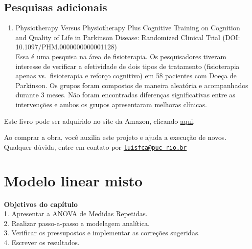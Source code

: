 \documentclass[
]{book}
\providecommand{\tightlist}{%
  \setlength{\itemsep}{0pt}\setlength{\parskip}{0pt}}
\newenvironment{objectives}{
  \definecolor{shadecolor}{rgb}{0, 0, 0}  %
  \color{white}
  \begin{shaded}}
 {\end{shaded}}
\begin{document}
\hypertarget{pesquisas-adicionais-5}{%
\section{Pesquisas adicionais}\label{pesquisas-adicionais-5}}

\begin{enumerate}
\def\labelenumi{\arabic{enumi}.}
\tightlist
\item
  Physiotherapy Versus Physiotherapy Plus Cognitive Training on Cognition and Quality of Life in Parkinson Disease: Randomized Clinical Trial (DOI: 10.1097/PHM.0000000000001128)\\
  Essa é uma pesquisa na área de fisioterapia. Os pesquisadores tiveram interesse de verificar a efetividade de dois tipos de tratamento (fisioterapia apenas vs.~fisioterapia e reforço cognitivo) em 58 pacientes com Doeça de Parkinson. Os grupos foram compostos de maneira aleatória e acompanhados durante 3 meses. Não foram encontradas diferenças significativas entre as intervenções e ambos os grupos apresentaram melhoras clínicas.
\end{enumerate}

Este livro pode ser adquirido no site da Amazon, clicando \href{https://www.amazon.com.br/gp/product/B097CP7T9M?pf_rd_r=RDZC8XYMBC1WY69T0J8K\&pf_rd_p=abb22e6b-8812-4b76-a424-5f0b098d2c90\&pd_rd_r=ceec1911-f409-4acd-ac8f-2d5bc68dac43\&pd_rd_w=wMUzJ\&pd_rd_wg=ZK85a\&ref_=pd_gw_unk}{aqui}.

Ao comprar a obra, você auxilia este projeto e ajuda a execução de novos. Qualquer dúvida, entre em contato por \href{mailto:luisfca@puc-rio.br}{\nolinkurl{luisfca@puc-rio.br}}

\hypertarget{modelo-linear-misto}{%
\chapter{Modelo linear misto}\label{modelo-linear-misto}}

\begin{objectives}
\textbf{Objetivos do capítulo}\\
1. Apresentar a ANOVA de Medidas Repetidas.\\
2. Realizar passo-a-passo a modelagem analítica.\\
3. Verificar os pressupostos e implementar as correções sugeridas.\\
4. Escrever os resultados.

\end{objectives}
\end{document}
